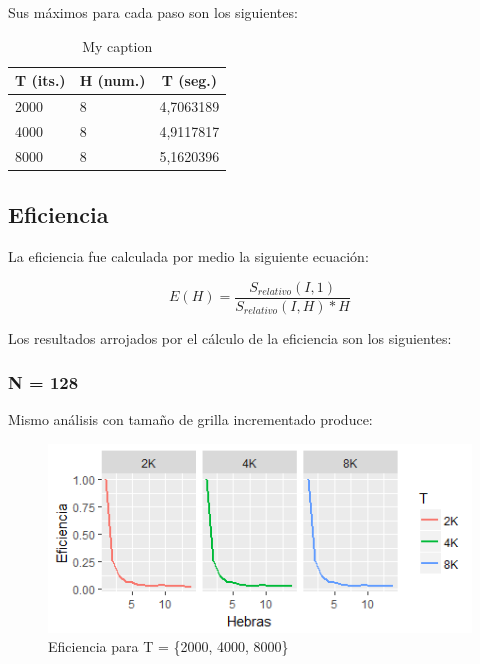 \documentclass[jou]{apa6}
\begin{document}
Sus máximos para cada paso son los siguientes:

\begin{table}[]
\centering
\caption{My caption}
\label{my-label}
\begin{tabular}{@{}lll@{}}
\toprule
\multicolumn{1}{c}{T (its.)} & \multicolumn{1}{c}{H (num.)} & \multicolumn{1}{c}{T (seg.)} \\ \midrule
2000                         & 8                            & 4,7063189                    \\
4000                         & 8                            & 4,9117817                    \\
8000                         & 8                            & 5,1620396                    \\ \bottomrule
\end{tabular}
\end{table}

\FloatBarrier

\subsection{Eficiencia}
La eficiencia fue calculada por medio la siguiente ecuación:

\[
	E(H) = \frac{S_{relativo}(I, 1)}{S_{relativo}(I, H) * H}
\]

Los resultados arrojados por el cálculo de la eficiencia son los siguientes:

\subsubsection{N = 128}
Mismo análisis con tamaño de grilla incrementado produce:

\begin{figure}[h]
	\includegraphics[width=\columnwidth]{efic-128px.png}
	\caption{Eficiencia para T = \{2000, 4000, 8000\}}
	\label{fig:Figure5}
\end{figure}
\end{document}
